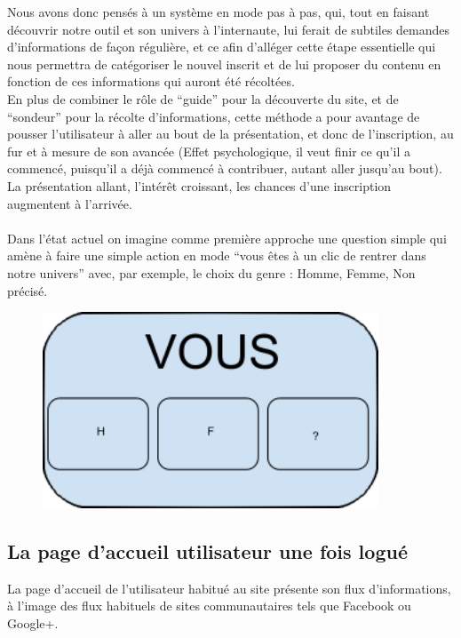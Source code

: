 \documentclass{life-fr}
\begin{document}
Nous avons donc pensés à un système en mode pas à pas, qui, tout en faisant découvrir notre outil et son univers à l'internaute, lui ferait de subtiles demandes d'informations de façon régulière, et ce afin d'alléger cette étape essentielle qui nous permettra de catégoriser le nouvel inscrit et de lui proposer du contenu en fonction de ces informations qui auront été récoltées.\\

En plus de combiner le rôle de “guide” pour la découverte du site, et de “sondeur” pour la récolte d'informations, cette méthode a pour avantage de pousser l'utilisateur à aller au bout de la présentation, et donc de l'inscription, au fur et à mesure de son avancée (Effet psychologique, il veut finir ce qu'il a commencé, puisqu'il a déjà commencé à contribuer, autant aller jusqu'au bout). La présentation allant, l'intérêt croissant, les chances d'une inscription augmentent à l'arrivée.\\
\\

Dans l'état actuel on imagine comme première approche une question simple qui amène à faire une simple action en mode ``vous êtes à un clic de rentrer dans notre univers'' avec, par exemple, le choix du genre : Homme, Femme, Non précisé.

\begin{figure}[H]
  \begin{center}
    \includegraphics[width=10cm]{img/vous.png}
  \end{center}
\end{figure}

\subsection{La page d'accueil utilisateur une fois logué}

La page d'accueil de l'utilisateur habitué au site présente son flux d'informations, à l'image des flux habituels de sites communautaires tels que Facebook ou Google+. \\
\end{document}
